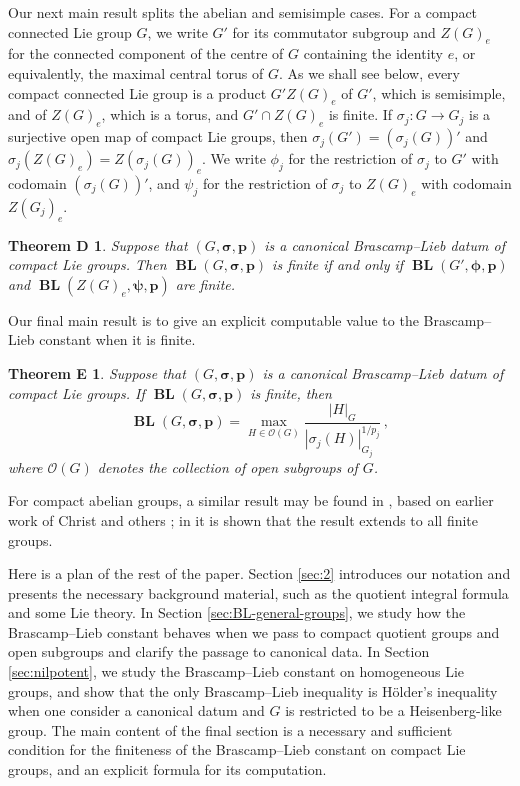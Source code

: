 \documentclass[12pt,twoside,a4paper]{amsart}
\newtheorem*{thmD}{Theorem D}
\newtheorem*{thmE}{Theorem E}
\theoremstyle{definition}
\theoremstyle{remark}
\numberwithin{equation}{section}
\newcommand{\BL}{\operatorname{\mathbf{BL}}}
\newcommand{\bss}{\boldsymbol{\sigma}}
\newcommand{\bsphi}{\boldsymbol{\phi}}
\newcommand{\bspsi}{\boldsymbol{\psi}}
\newcommand{\bsp}{\boldsymbol{p}}
\begin{document}
Our next main result splits the abelian and semisimple cases.
For a compact connected Lie group $G$, we write $G'$ for its commutator subgroup and $Z(G)_e$ for the connected component of the centre of $G$ containing the identity $e$, or equivalently, the maximal central torus of $G$. 
As we shall see below, every compact connected Lie group is a product $G' Z(G)_e$ of $G'$, which is semisimple, and of $Z(G)_e$, which is a torus, and $G' \cap Z(G)_e$ is finite.
If $\sigma_j\colon  G \to G_j$ is a surjective open map of compact Lie groups, then $\sigma_j(G') = (\sigma_j(G))'$ and $\sigma_j(Z(G)_e) = Z(\sigma_j(G))_e$.
We write $\phi_j$  for the restriction of $\sigma_j$ to $G'$ with codomain $(\sigma_j(G))'$, and
$\psi_j$ for the restriction of $\sigma_j$ to $Z(G)_e$ with codomain $Z(G_j)_e$.


\begin{thmD}
Suppose that $(G, \bss,\bsp)$ is a canonical Brascamp--Lieb datum of compact Lie groups.
Then $\BL(G, \bss,\bsp)$ is finite if and only if $\BL(G', \bsphi,\bsp)$  and $\BL(Z(G)_e, \bspsi,\bsp)$  are finite.
\end{thmD}




Our final main result is to give an explicit computable value to the Brascamp--Lieb constant when it is finite.

\begin{thmE}
Suppose that $(G, \bss,\bsp)$ is a canonical Brascamp--Lieb datum of compact Lie groups.
If $\BL(G, \bss, \bsp)$ is finite, then
\begin{equation}\label{eq:BL-norm}
\BL(G, \bss, \bsp) 
= \max_{H \in \mathcal{O}(G)} \frac{ |H|_G}  {| \sigma_j(H) |_{G_j}^{1/p_j}} \,,
\end{equation}
where $\mathcal{O}(G)$ denotes the collection of open subgroups of $G$.
\end{thmE}


For compact abelian groups, a similar result may be found in \cite{BJ22}, based on earlier work of Christ and others \cite{Chr13, CDKSY24}; in \cite{BJ22} it is shown that the result extends to all finite groups.

Here is a plan of the rest of the paper. 
Section \ref{sec:2} introduces our notation and presents the necessary background material, such as the quotient integral formula and some Lie theory. 
In Section \ref{sec:BL-general-groups}, we study how the Brascamp–Lieb constant behaves when we pass to compact quotient groups and open subgroups and clarify the passage to canonical data. 
In Section \ref{sec:nilpotent}, we study the Brascamp--Lieb constant on homogeneous Lie groups, and show  that the only Brascamp--Lieb inequality is Hölder's inequality when one consider a canonical datum and $G$ is restricted to be a Heisenberg-like group.
The main content of the final section is a necessary and sufficient condition for the finiteness of the Brascamp–Lieb constant on compact Lie groups, and an explicit formula for its computation.
\end{document}

